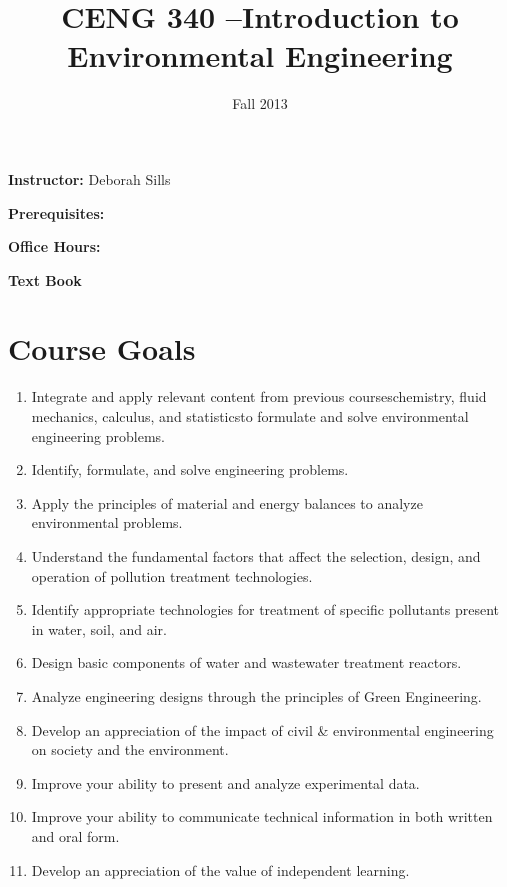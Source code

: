 \documentclass[a4paper, 12pt]{article}
\begin{document}
\title {\textbf{CENG 340 --Introduction to Environmental Engineering}} 

\date {Fall 2013}
\maketitle

 {\bf Instructor:} Deborah Sills
 
 {\bf Prerequisites:}
 
 {\bf Office Hours:}
 
 {\bf Text Book}
 


\section *{Course Goals}
\begin{enumerate}
\item Integrate and apply relevant content from previous courses\textemdash chemistry, fluid mechanics, calculus, and statistics\textemdash to formulate and solve environmental engineering problems.
\item Identify, formulate, and solve engineering problems.
\item Apply the principles of material and energy balances to analyze environmental problems.
\item Understand the fundamental factors that affect the selection, design, and operation of pollution treatment technologies.
\item Identify appropriate technologies for treatment of specific pollutants present in water, soil, and air.
\item Design basic components of water and wastewater treatment reactors.
\item Analyze engineering designs through the principles of Green Engineering.
\item Develop an appreciation of the impact of civil \& environmental engineering on society and the environment.
\item Improve your ability to present and analyze experimental data. 
\item Improve your ability to communicate technical information in both written and oral form.
\item Develop an appreciation of the value of independent learning.

\end{enumerate}
\end{document}
